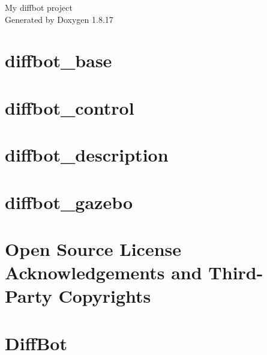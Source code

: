 \let\mypdfximage\pdfximage\def\pdfximage{\immediate\mypdfximage}\documentclass[twoside]{book}
\newcommand{\+}{\discretionary{\mbox{\scriptsize$\hookleftarrow$}}{}{}}
\newcommand{\clearemptydoublepage}{%
  \newpage{\pagestyle{empty}\cleardoublepage}%
}
\begin{document}
\hypersetup{pageanchor=false,
             bookmarksnumbered=true,
             pdfencoding=unicode
            }
\begin{titlepage}
\vspace*{7cm}
\begin{center}%
{\Large My diffbot project }\\
\vspace*{1cm}
{\large Generated by Doxygen 1.8.17}\\
\end{center}
\end{titlepage}
\clearemptydoublepage
{}
\tableofcontents
\clearemptydoublepage
{}
\hypersetup{pageanchor=true}

\chapter{diffbot\+\_\+base}
\label{md_diffbot_base_README}

\chapter{diffbot\+\_\+control}
\label{md_diffbot_control_README}

\chapter{diffbot\+\_\+description}
\label{md_diffbot_description_README}

\chapter{diffbot\+\_\+gazebo}
\label{md_diffbot_gazebo_README}

\chapter{Open Source License Acknowledgements and Third-\/\+Party Copyrights}
\label{md_open-source-license-acknowledgements-and-third-party-copyrights}

\chapter{Diff\+Bot}
\label{md_README}

\end{document}

